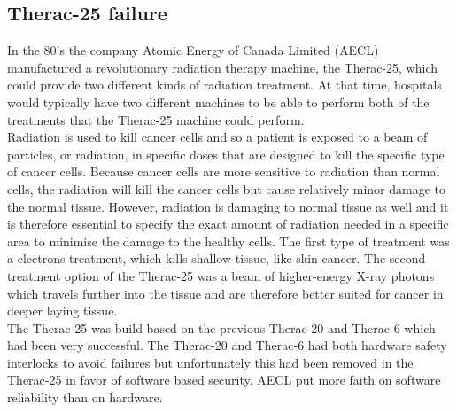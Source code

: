 \subsection{Therac-25 failure}
In the 80's the company Atomic Energy of Canada Limited (AECL) manufactured a revolutionary radiation therapy machine, the Therac-25\cite{Leveson1993}, which could provide two different kinds of radiation treatment. At that time, hospitals would typically have two different machines to be able to perform both of the treatments that the Therac-25 machine could perform.\\
Radiation is used to kill cancer cells and so a patient is exposed to a beam of particles, or radiation, in specific doses that are designed to kill the specific type of cancer cells. Because cancer cells are more sensitive to radiation than normal cells, the radiation will kill the cancer cells but cause relatively minor damage to the normal tissue. However, radiation is damaging to normal tissue as well and it is therefore essential to specify the exact amount of radiation needed in a specific area to minimise the damage to the healthy cells.
The first type of treatment was a electrons treatment, which kills shallow tissue, like skin cancer. The second treatment option of the Therac-25 was a beam of higher-energy X-ray photons which travels further into the tissue and are therefore better suited for cancer in deeper laying tissue. \\

The Therac-25 was build based on the previous Therac-20 and Therac-6 which had been very successful. The Therac-20 and Therac-6 had both hardware safety interlocks to avoid failures but unfortunately this had been removed in the Therac-25 in favor of software based security. AECL put more faith on software reliability than on hardware. \\

